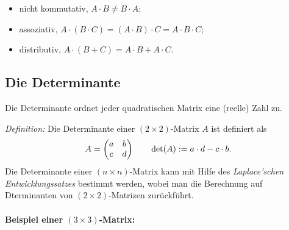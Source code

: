 \begin{itemize}
    \item nicht kommutativ, $A \cdot B \neq B\cdot A$;
    \item assoziativ, $A\cdot(B\cdot C) = (A\cdot B)\cdot C = A\cdot B\cdot C$;
    \item distributiv, $A\cdot (B+C) = A\cdot B + A\cdot C.$
\end{itemize}

\subsection{Die Determinante}

Die Determinante ordnet jeder quadratischen Matrix eine (reelle) Zahl zu. 

\emph{Definition: } Die Determinante einer $(2\times 2)$-Matrix $A$ ist definiert als 
\begin{align}
    A = \mqty(a & b \\ c & d) \qquad \det(A) := a\cdot d - c \cdot b.
\end{align}
Die Determinante einer $(n\times n)$-Matrix kann mit Hilfe des \emph{Laplace'schen Entwicklungssatzes} bestimmt werden, wobei man die Berechnung auf Dterminanten von $(2\times 2)$-Matrizen zurückführt.

\paragraph{Beispiel einer $(3\times3)$-Matrix: }$~$

